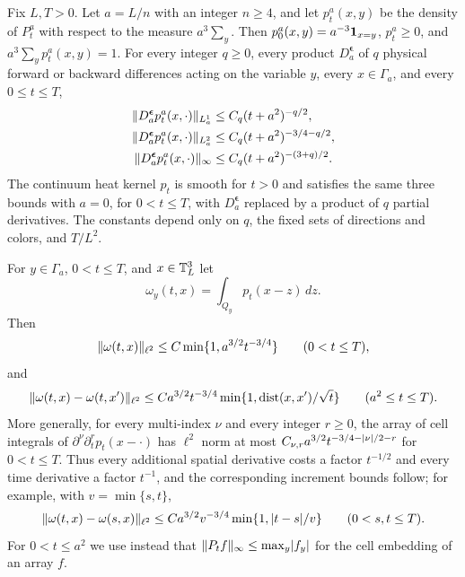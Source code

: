 \begin{lemma}\label{ch13:lem:heat-and-chaining}
Fix $L,T>0$. Let $a=L/n$ with an integer $n\ge4$, and let $p_t^a(x,y)$ be the density of $P_t^a$ with respect to the measure $a^3\sum_y$. Then $p_0^a(x,y)=a^{-3}\mathbf 1_{x=y}$, $p_t^a\ge0$, and $a^3\sum_yp_t^a(x,y)=1$. For every integer $q\ge0$, every product $D_a^{\boldsymbol\epsilon}$ of $q$ physical forward or backward differences acting on the variable $y$, every $x\in\Gamma_a$, and every $0\le t\le T$,
\begin{equation}\label{ch13:eq:discrete-heat-bounds}
 \begin{split}
 \lVert D_a^{\boldsymbol\epsilon}p_t^a(x,\cdot)\rVert_{L^1_a}&\le C_q(t+a^2)^{-q/2},\\
 \lVert D_a^{\boldsymbol\epsilon}p_t^a(x,\cdot)\rVert_{L^2_a}&\le C_q(t+a^2)^{-3/4-q/2},\\
 \lVert D_a^{\boldsymbol\epsilon}p_t^a(x,\cdot)\rVert_\infty&\le C_q(t+a^2)^{-(3+q)/2}.
 \end{split}
\end{equation}
The continuum heat kernel $p_t$ is smooth for $t>0$ and satisfies the same three bounds with $a=0$, for $0<t\le T$, with $D_a^{\boldsymbol\epsilon}$ replaced by a product of $q$ partial derivatives. The constants depend only on $q$, the fixed sets of directions and colors, and $T/L^2$.

For $y\in\Gamma_a$, $0<t\le T$, and $x\in\mathbb T_L^3$ let
\[
 \omega_y(t,x)=\int_{Q_y}p_t(x-z)\,dz.
\]
Then
\[
 \lVert \omega(t,x)\rVert_{\ell^2}\le C\min\{1,a^{3/2}t^{-3/4}\}\qquad(0<t\le T),
\]
and
\[
 \lVert \omega(t,x)-\omega(t,x')\rVert_{\ell^2}\le Ca^{3/2}t^{-3/4}\min\{1,\operatorname{dist}(x,x')/\sqrt t\}\qquad(a^2\le t\le T).
\]
More generally, for every multi-index $\nu$ and every integer $r\ge0$, the array of cell integrals of $\partial^\nu\partial_t^rp_t(x-\cdot)$ has $\ell^2$ norm at most $C_{\nu,r}a^{3/2}t^{-3/4-\lvert \nu\rvert/2-r}$ for $0<t\le T$. Thus every additional spatial derivative costs a factor $t^{-1/2}$ and every time derivative a factor $t^{-1}$, and the corresponding increment bounds follow; for example, with $v=\min\{s,t\}$,
\[
 \lVert \omega(t,x)-\omega(s,x)\rVert_{\ell^2}\le Ca^{3/2}v^{-3/4}\min\{1,\lvert t-s\rvert/v\}\qquad(0<s,t\le T).
\]
For $0<t\le a^2$ we use instead that $\lVert P_tf\rVert_\infty\le\max_y\lvert f_y\rvert$ for the cell embedding of an array $f$.


\end{lemma}
